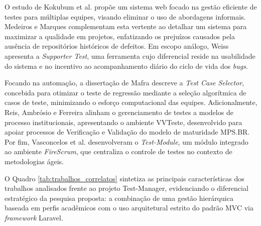 O estudo de Kokubum et al. \cite{kokubum2025} propõe um sistema web focado na gestão eficiente de testes para múltiplas equipes, visando eliminar o uso de abordagens informais. Medeiros e Marques \cite{medeiros2022} complementam esta vertente ao detalhar um sistema para maximizar a qualidade em projetos, enfatizando os prejuízos causados pela ausência de repositórios históricos de defeitos. Em escopo análogo, Weiss \cite{weiss2013} apresenta a \textit{Supporter Test}, uma ferramenta cujo diferencial reside na usabilidade do sistema e no incentivo ao acompanhamento diário do ciclo de vida dos \textit{bugs}.

Focando na automação, a dissertação de Mafra \cite{mafra2010} descreve a \textit{Test Case Selector}, concebida para otimizar o teste de regressão mediante a seleção algorítmica de casos de teste, minimizando o esforço computacional das equipes. Adicionalmente, Reis, Ambrósio e Ferreira \cite{reis2012} alinham o gerenciamento de testes a modelos de processo institucionais, apresentando o ambiente VVTeste, desenvolvido para apoiar processos de Verificação e Validação do modelo de maturidade MPS.BR. Por fim, Vasconcelos et al. \cite{vasconcelos2013} desenvolveram o \textit{Test-Module}, um módulo integrado ao ambiente \textit{FireScrum}, que centraliza o controle de testes no contexto de metodologias ágeis.

O Quadro \ref{tab:trabalhos_correlatos} sintetiza as principais características dos trabalhos analisados frente ao projeto Test-Manager, evidenciando o diferencial estratégico da pesquisa proposta: a combinação de uma gestão hierárquica baseada em perfis acadêmicos com o uso arquitetural estrito do padrão MVC via \textit{framework} Laravel.

